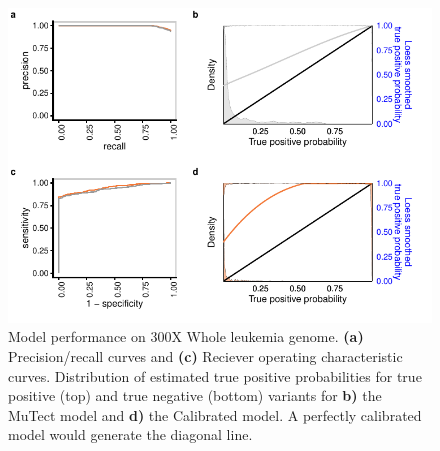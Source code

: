\documentclass[a4,center,fleqn]{NAR}
\begin{document}
\begin{figure}[t]
  \begin{center}
  \includegraphics{figures/aml_plot.pdf}
  \end{center}
  \caption{Model performance on 300X Whole leukemia genome.
  \textbf{(a)} Precision/recall curves and \textbf{(c)} Reciever operating characteristic curves.
  Distribution of estimated true positive probabilities for true positive (top) and true negative (bottom) variants for \textbf{b)} the MuTect model and \textbf{d)} the Calibrated model.
  A perfectly calibrated model would generate the diagonal line.}
  \label{NAR-aml}
\end{figure}
\end{document}

